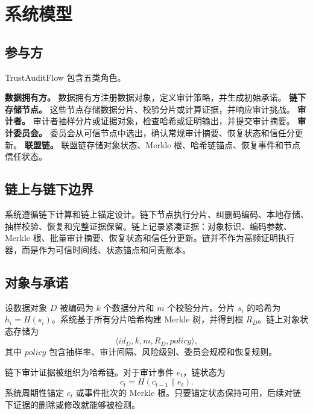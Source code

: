 \section{系统模型}

\subsection{参与方}

TrustAuditFlow 包含五类角色。

\textbf{数据拥有方。} 数据拥有方注册数据对象，定义审计策略，并生成初始承诺。
\textbf{链下存储节点。} 这些节点存储数据分片、校验分片或计算证据，并响应审计挑战。
\textbf{审计者。} 审计者抽样分片或证据对象，检查哈希或证明输出，并提交审计摘要。
\textbf{审计委员会。} 委员会从可信节点中选出，确认常规审计摘要、恢复状态和信任分更新。
\textbf{联盟链。} 联盟链存储对象状态、Merkle 根、哈希链锚点、恢复事件和节点信任状态。

\subsection{链上与链下边界}

系统遵循链下计算和链上锚定设计。链下节点执行分片、纠删码编码、本地存储、抽样校验、恢复和完整证据保留。链上记录紧凑证据：对象标识、编码参数、Merkle 根、批量审计摘要、恢复状态和信任分更新。链并不作为高频证明执行器，而是作为可信时间线、状态锚点和问责账本。

\subsection{对象与承诺}

设数据对象 $D$ 被编码为 $k$ 个数据分片和 $m$ 个校验分片。分片 $s_i$ 的哈希为 $h_i=H(s_i)$。系统基于所有分片哈希构建 Merkle 树，并得到根 $R_D$。链上对象状态存储为
\begin{equation}
  \langle id_D, k, m, R_D, policy \rangle,
\end{equation}
其中 $policy$ 包含抽样率、审计间隔、风险级别、委员会规模和恢复规则。

链下审计证据被组织为哈希链。对于审计事件 $e_t$，链状态为
\begin{equation}
  c_t = H(c_{t-1} \parallel e_t).
\end{equation}
系统周期性锚定 $c_t$ 或事件批次的 Merkle 根。只要锚定状态保持可用，后续对链下证据的删除或修改就能够被检测。

